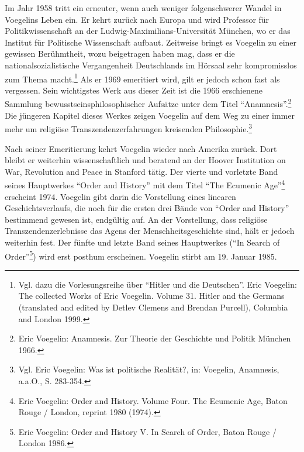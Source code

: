 \documentclass[12pt,a4paper,ngerman]{article}
\begin{document}

Im Jahr 1958 tritt ein erneuter, wenn auch weniger folgenschwerer Wandel in
Voegelins Leben ein. Er kehrt zurück nach Europa und wird Professor für
Politikwissenschaft an der Ludwig-Maximilians-Universität München, wo er das
Institut für Politische Wissenschaft aufbaut.  Zeitweise bringt es Voegelin zu
einer gewissen Berühmtheit, wozu beigetragen haben mag, dass er die
nationalsozialistische Vergangenheit Deutschlands im Hörsaal sehr
kompromisslos zum Thema macht.\footnote{Vgl. dazu die Vorlesungsreihe über
  "`Hitler und die Deutschen"'.  Eric Voegelin: The collected Works of Eric
  Voegelin. Volume 31.  Hitler and the Germans (translated and edited by
  Detlev Clemens and Brendan Purcell), Columbia and London 1999.} Als er 1969
emeritiert wird, gilt er jedoch schon fast als vergessen. Sein wichtigstes
Werk aus dieser Zeit ist die 1966 erschienene Sammlung
bewusstseinsphilosophischer Aufsätze unter dem Titel
"`Anamnesis"'.\footnote{Eric Voegelin: Anamnesis. Zur Theorie der Geschichte
  und Politik München 1966.} Die jüngeren Kapitel dieses Werkes zeigen
Voegelin auf dem Weg zu einer immer mehr um religiöse Transzendenzerfahrungen
kreisenden Philosophie.\footnote{Vgl.  Eric Voegelin: Was ist politische
  Realität?, in: Voegelin, Anamnesis, a.a.O., S. 283-354.}

Nach seiner Emeritierung kehrt Voegelin wieder nach Amerika zurück. Dort
bleibt er weiterhin wissenschaftlich und beratend an der Hoover Institution on
War, Revolution and Peace in Stanford tätig. Der vierte und vorletzte Band
seines Hauptwerkes "`Order and History"' mit dem Titel "`The Ecumenic
Age"'\footnote{Eric Voegelin: Order and History.  Volume Four. The Ecumenic
  Age, Baton Rouge / London, reprint 1980 (1974).} erscheint 1974. Voegelin
gibt darin die Vorstellung eines linearen Geschichtsverlaufs, die noch für die
ersten drei Bände von "`Order and History"' bestimmend gewesen ist, endgültig
auf. An der Vorstellung, dass religiöse Transzendenzerlebnisse das Agens der
Menschheitsgeschichte sind, hält er jedoch weiterhin fest. Der fünfte und
letzte Band seines Hauptwerkes ("`In Search of Order"'\footnote{Eric Voegelin:
  Order and History V. In Search of Order, Baton Rouge / London 1986.}) wird
erst posthum erscheinen.  Voegelin stirbt am 19. Januar 1985.
\end{document}
